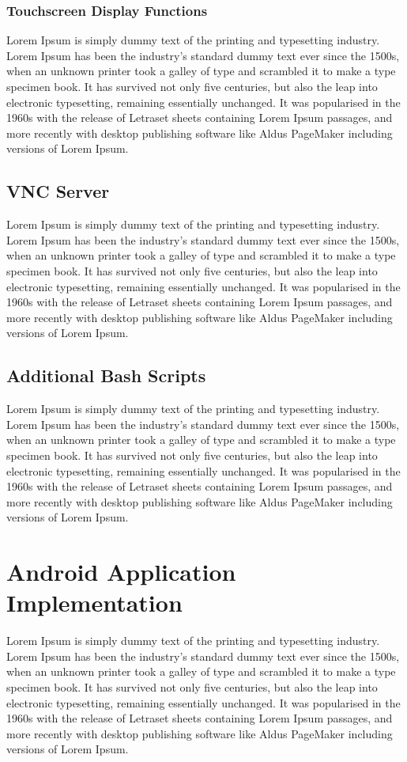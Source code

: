 \subsubsection{Touchscreen Display Functions}
Lorem Ipsum is simply dummy text of the printing and typesetting industry. Lorem Ipsum has been the industry's standard dummy text ever since the 1500s, when an unknown printer took a galley of type and scrambled it to make a type specimen book. It has survived not only five centuries, but also the leap into electronic typesetting, remaining essentially unchanged. It was popularised in the 1960s with the release of Letraset sheets containing Lorem Ipsum passages, and more recently with desktop publishing software like Aldus PageMaker including versions of Lorem Ipsum.

\subsection{VNC Server}
Lorem Ipsum is simply dummy text of the printing and typesetting industry. Lorem Ipsum has been the industry's standard dummy text ever since the 1500s, when an unknown printer took a galley of type and scrambled it to make a type specimen book. It has survived not only five centuries, but also the leap into electronic typesetting, remaining essentially unchanged. It was popularised in the 1960s with the release of Letraset sheets containing Lorem Ipsum passages, and more recently with desktop publishing software like Aldus PageMaker including versions of Lorem Ipsum.

\subsection{Additional Bash Scripts}
Lorem Ipsum is simply dummy text of the printing and typesetting industry. Lorem Ipsum has been the industry's standard dummy text ever since the 1500s, when an unknown printer took a galley of type and scrambled it to make a type specimen book. It has survived not only five centuries, but also the leap into electronic typesetting, remaining essentially unchanged. It was popularised in the 1960s with the release of Letraset sheets containing Lorem Ipsum passages, and more recently with desktop publishing software like Aldus PageMaker including versions of Lorem Ipsum.

\section{Android Application Implementation}
Lorem Ipsum is simply dummy text of the printing and typesetting industry. Lorem Ipsum has been the industry's standard dummy text ever since the 1500s, when an unknown printer took a galley of type and scrambled it to make a type specimen book. It has survived not only five centuries, but also the leap into electronic typesetting, remaining essentially unchanged. It was popularised in the 1960s with the release of Letraset sheets containing Lorem Ipsum passages, and more recently with desktop publishing software like Aldus PageMaker including versions of Lorem Ipsum.


